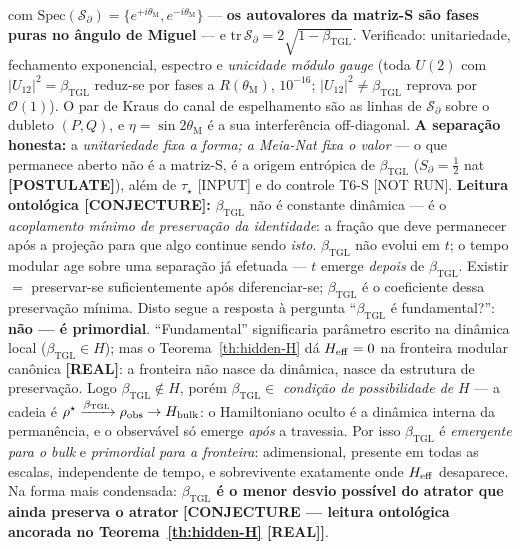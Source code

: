\documentclass[12pt,a4paper]{article}
\newcommand{\betatgl}{\beta_{\text{TGL}}}
\newcommand{\thetaM}{\theta_{\text{M}}}
\newcommand{\rhostar}{\rho^{\star}}
\begin{document}
com $\mathrm{Spec}(\mathcal S_\partial) = \{e^{+i\thetaM}, e^{-i\thetaM}\}$ --- \textbf{os autovalores da matriz-S são fases puras no ângulo de Miguel} --- e $\mathrm{tr}\,\mathcal S_\partial = 2\sqrt{1-\betatgl}$.  Verificado: unitariedade, fechamento exponencial, espectro e \emph{unicidade módulo gauge} (toda $U(2)$ com $|U_{12}|^2=\betatgl$ reduz-se por fases a $R(\thetaM)$, $10^{-16}$; $|U_{12}|^2\neq\betatgl$ reprova por $\mathcal O(1)$).  O par de Kraus do canal de espelhamento são as linhas de $\mathcal S_\partial$ sobre o dubleto $(P,Q)$, e $\eta=\sin 2\thetaM$ é a sua interferência off-diagonal.  \textbf{A separação honesta:} a \emph{unitariedade fixa a forma; a Meia-Nat fixa o valor} --- o que permanece aberto não é a matriz-S, é a origem entrópica de $\betatgl$ ($S_\partial=\tfrac12$ nat \textbf{[POSTULATE]}), além de $\tau_\star$ [INPUT] e do controle T6-S [NOT RUN].  \textbf{Leitura ontológica [CONJECTURE]:} $\betatgl$ não é constante dinâmica --- é o \emph{acoplamento mínimo de preservação da identidade}: a fração que deve permanecer após a projeção para que algo continue sendo \emph{isto}.  $\betatgl$ não evolui em $t$; o tempo modular age sobre uma separação já efetuada --- $t$ emerge \emph{depois} de $\betatgl$.  Existir $=$ preservar-se suficientemente após diferenciar-se; $\betatgl$ é o coeficiente dessa preservação mínima.  Disto segue a resposta à pergunta ``$\betatgl$ é fundamental?'': \textbf{não --- é primordial}.  ``Fundamental'' significaria parâmetro escrito na dinâmica local ($\betatgl \in H$); mas o Teorema~\ref{th:hidden-H} dá $H_{\rm eff}=0$ na fronteira modular canônica \textbf{[REAL]}: a fronteira não nasce da dinâmica, nasce da estrutura de preservação.  Logo $\betatgl \notin H$, porém $\betatgl \in$ \emph{condição de possibilidade de} $H$ --- a cadeia é $\rhostar \xrightarrow{\betatgl} \rho_{\rm obs} \to H_{\rm bulk}$: o Hamiltoniano oculto é a dinâmica interna da permanência, e o observável só emerge \emph{após} a travessia.  Por isso $\betatgl$ é \emph{emergente para o bulk} e \emph{primordial para a fronteira}: adimensional, presente em todas as escalas, independente de tempo, e sobrevivente exatamente onde $H_{\rm eff}$ desaparece.  Na forma mais condensada: \textbf{$\betatgl$ é o menor desvio possível do atrator que ainda preserva o atrator} \textbf{[CONJECTURE --- leitura ontológica ancorada no Teorema~\ref{th:hidden-H} [REAL]]}.
\end{document}
